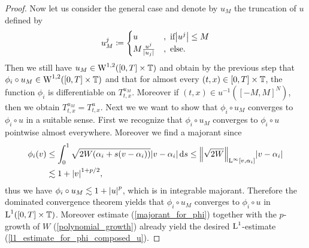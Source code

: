 \begin{proof}
	Now let us consider the general case and denote by $ u_{ M } $ the truncation of $ u $ defined by
	\begin{equation*}
		u_{ M }^{ j } 
		\coloneqq
		\begin{cases}
			u &, \text{ if} \abs{ u^{ j } } \leq M 
			\\
			M \frac{ u^{ j } }{ \abs{ u_{ j } } }
			&, \text{ else}.
		\end{cases}
	\end{equation*}
	Then we still have $ u_{ M } \in \operatorname{W}^{ 1, 2 } ( [ 0 , T ] \times \operatorname{\mathbb{T}} ) $ and obtain by the previous step that $ \phi_{ i } \circ u_{ M } \in \operatorname{W}^{ 1, 2 } ( [ 0 , T ] \times \operatorname{\mathbb{T}} ) $ and that for almost every $ ( t, x ) \in [ 0 , T ] \times \operatorname{\mathbb{T}} $, the function $ \phi_{ i } $ is differentiable on $ T_{ t, x }^{ u_{ M } } $. Moreover if $ ( t, x ) \in u^{ - 1 } ( [ - M , M ]^{ N } ) $, then we obtain $ T_{ t, x }^{ u_{ M } } = T_{ t, x }^{ u } $.
	Next we we want to show that $ \phi_{ i } \circ u_{ M } $ converges to $ \phi_{ i } \circ u $ in a suitable sense. First we recognize that $ \phi_{ i } \circ u_{ M } $ converges to $ \phi_{ i } \circ u $ pointwise almost everywhere. Moreover we find a majorant since
	\begin{align}
		\notag
		\phi_{ i } ( v ) 
		&
		\leq
		\int_{ 0 }^{ 1 }
			\sqrt{ 2 W ( \alpha_{ i } + s ( v - \alpha_{ i } ) ) }
			\abs{ v - \alpha_{i } }
		\dd{ s }
		\leq
		\norm{ \sqrt{ 2 W } }_{ \operatorname{L}^{ \infty } [ v, \alpha_{ i } ] }
		\abs{ v - \alpha_{ i } }
		\\
		\label{majorant_for_phi}
		& \lesssim
		1 + \abs{ v }^{ 1 + p/2 },
	\end{align}
	thus we have $ \phi_{ i } \circ u_{ M } \lesssim 1 + \abs{ u }^{ p } $, which is in integrable majorant. Therefore the dominated convergence theorem yields that $ \phi_{ i } \circ u_{ M } $ converges to $ \phi_{ i } \circ u $ in $ \operatorname{L}^{ 1 } ( [ 0 , T ] \times \operatorname{\mathbb{T}} ) $.
	Moreover estimate (\ref{majorant_for_phi}) together with the $ p $-growth of $ W $ (\ref{polynomial_growth}) already yield the desired $ \operatorname{L}^{ 1 } $-estimate (\ref{l1_estimate_for_phi_composed_u}).
	

\end{proof}
